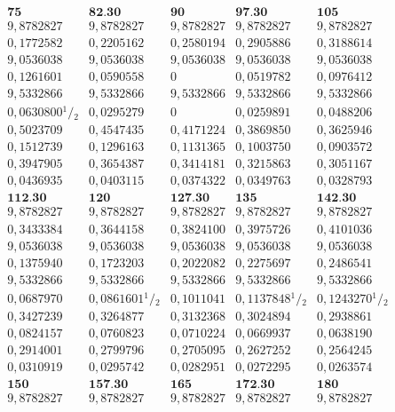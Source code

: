 \clearpage
\[\begin{array}{|r|r|r|r|r|}
\mathbf{75}&\mathbf{82{.}30}&\mathbf{90}&\mathbf{97{.}30}&\mathbf{105}\\
9{,}8782827&9{,}8782827&9{,}8782827&9{,}8782827&9{,}8782827\\
0{,}1772582&0{,}2205162&0{,}2580194&0{,}2905886&0{,}3188614\\[5pt]
9{,}0536038&9{,}0536038&9{,}0536038&9{,}0536038&9{,}0536038\\
0{,}1261601&0{,}0590558&0&0{,}0519782&0{,}0976412\\[5pt]
9{,}5332866&9{,}5332866&9{,}5332866&9{,}5332866&9{,}5332866\\
0{,}0630800{}^{1}\! /\! {}_{2}&0{,}0295279&0&0{,}0259891&0{,}0488206\\[5pt]
0{,}5023709&0{,}4547435&0{,}4171224&0{,}3869850&0{,}3625946\\
0{,}1512739&0{,}1296163&0{,}1131365&0{,}1003750&0{,}0903572\\
0{,}3947905&0{,}3654387&0{,}3414181&0{,}3215863&0{,}3051167\\
0{,}0436935&0{,}0403115&0{,}0374322&0{,}0349763&0{,}0328793\\\hline
\mathbf{112{.}30}&\mathbf{120}&\mathbf{127{.}30}&\mathbf{135}&\mathbf{142{.}30}\\
9{,}8782827&9{,}8782827&9{,}8782827&9{,}8782827&9{,}8782827\\
0{,}3433384&0{,}3644158&0{,}3824100&0{,}3975726&0{,}4101036\\[5pt]
9{,}0536038&9{,}0536038&9{,}0536038&9{,}0536038&9{,}0536038\\
0{,}1375940&0{,}1723203&0{,}2022082&0{,}2275697&0{,}2486541\\[5pt]
9{,}5332866&9{,}5332866&9{,}5332866&9{,}5332866&9{,}5332866\\
0{,}0687970&0{,}0861601{}^{1}\! /\! {}_{2}&0{,}1011041&0{,}1137848{}^{1}\! /\! {}_{2}&0{,}1243270{}^{1}\! /\! {}_{2}\\[5pt]
0{,}3427239&0{,}3264877&0{,}3132368&0{,}3024894&0{,}2938861\\
0{,}0824157&0{,}0760823&0{,}0710224&0{,}0669937&0{,}0638190\\
0{,}2914001&0{,}2799796&0{,}2705095&0{,}2627252&0{,}2564245\\
0{,}0310919&0{,}0295742&0{,}0282951&0{,}0272295&0{,}0263574\\\hline
\mathbf{150}&\mathbf{157{.}30}&\mathbf{165}&\mathbf{172{.}30}&\mathbf{180}\\
9{,}8782827&9{,}8782827&9{,}8782827&9{,}8782827&9{,}8782827\\

\end{array}\]
